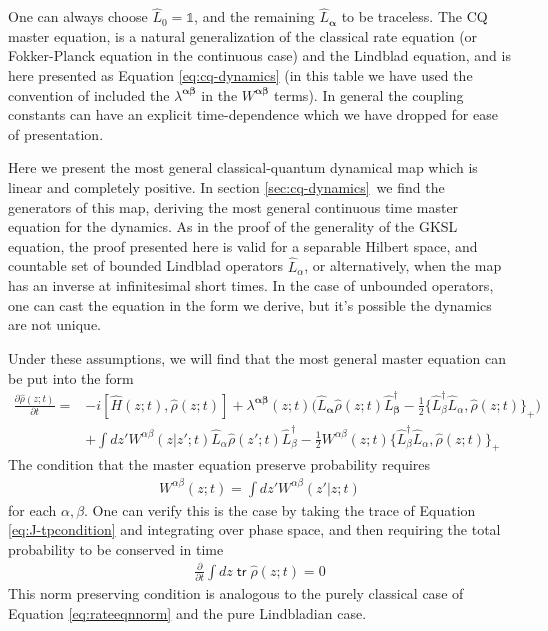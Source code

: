 \documentclass[aps,pra,showpacs,citeautoscript,amsmath,amssymb,floatfix,superscriptaddress,bbm, verbatim,amsfonts,changes,12pt,nofootinbib,longbibliography]{revtex4-2}
\newcommand{\id}{\mathbb{1}}
\newcommand{\tr}{\mathop{\mathsf{tr}}\nolimits}
\newcommand{\ag}{{\boldsymbol\alpha}}
\newcommand{\bg}{{\boldsymbol\beta}}
\def\z{{z}}
\def\L{{\hat{L}}}
\def\Hq{\hat{H}}
\def\dz{{d\z}}
\def\rate{{W}}
\def\linrate{{\lambda}}
\renewcommand{\varrho}{\hat{\rho}}
\def\psiz{{\varrho(\z;t)}}
\def\psizt{{\varrho(\z;t)}}
\def\psizp{{\varrho(\z';t)}}
\begin{document}
\begin{table}
\begin{center}
{				One can always choose $\L_0=\id$, and the remaining $\L_\ag$ to be traceless\cite{UCLPawula}.
				The CQ master equation, is a natural generalization of the classical rate equation (or Fokker-Planck equation in the continuous case) and the Lindblad equation, and is here presented as Equation \eqref{eq:cq-dynamics} (in this table we have used the convention of included the $\lambda^{\ag\bg}$ in the $\rate^{\ag\bg}$ terms). In general the coupling constants can have an explicit time-dependence which we have dropped for ease of presentation.}
		\endgroup
	\end{center}
\end{table}

Here we present the most general classical-quantum dynamical map which is linear and completely positive. In section \ref{sec:cq-dynamics}\ we find the generators of this map, deriving the most general continuous time master equation for the dynamics. As in the proof of the generality of the GKSL equation, the proof presented here is valid for a separable Hilbert space, and countable set of bounded Lindblad operators $\L_\alpha$, or alternatively, when the map has an inverse at infinitesimal short times.
In the case of unbounded operators\cite{siemon2017unbounded}, one can cast the equation in the form we derive, but it's possible the dynamics are not unique. %

Under these assumptions, we will find that the most general master equation can be put into the form
\begin{align}
  \frac{\partial\psiz}{\partial t}
  =&-i[\Hq(\z;t),\psiz]+
 \linrate^{\ag\bg}(\z;t)\Big(
\L_{\ag}\psizt \L_{\bg}^\dagger
  -
  \frac{1}{2}\{\L_\beta^\dagger\L_\alpha,\psiz\}_+
  \Big)
  \nonumber\\
&+
 \int d\z' 
 \rate^{\alpha\beta}(\z|\z';t)
  \L_{\alpha}\psizp\L_{\beta}^\dagger  
-\frac{1}{2}\rate^{\alpha\beta}(\z;t)\{\L_\beta^\dagger\L_\alpha,\psiz\}_+
      \label{eq:cq-dynamics}
\end{align}
The condition that the master equation preserve probability requires
\begin{align}
\rate^{\alpha\beta}(\z;t)=\int \dz' \rate^{\alpha\beta}(\z'|\z;t)
\label{eq:J-tpcondition}
\end{align}
for each $\alpha,\beta$.
One can verify this is the case by  taking the trace of Equation \eqref{eq:J-tpcondition} and integrating over phase space, and then requiring the total probability to be conserved in time
\begin{align}
\frac{\partial}{\partial t}\int d\z\tr\psiz=0
\label{eq:tp-intime}
\end{align}
This norm preserving condition is analogous to the purely classical case of Equation \eqref{eq:rateeqnnorm} and the pure Lindbladian case.
\end{document}
